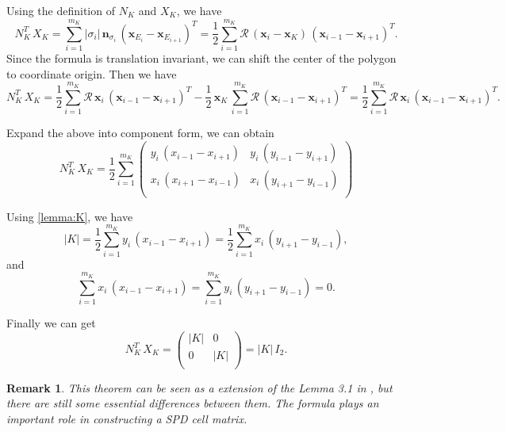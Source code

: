 \documentclass[times,review,preprint]{elsarticle}
\newtheorem{remark}{Remark}
\newcommand{\bx}{\bm{x}}
\newcommand{\bn}{\bm{n}}
\begin{document}
Using the definition of $N_K$ and $X_K$, we have
\begin{equation*}
N_K^T \, X_K = \sum_{i=1}^{m_K} |\sigma_{i}| \, \bn_{\sigma_{i}} \, (\bx_{E_{i}} - \bx_{E_{i+1}})^T = \frac12 \sum_{i=1}^{m_K} \mathcal{R} \, (\bx_{i} - \bx_K) \, (\bx_{i-1} - \bx_{i+1})^T.
\end{equation*}
Since the formula is translation invariant, we can shift the center of the polygon to coordinate origin. Then we have
\begin{equation*}
N_K^T \, X_K = \frac12 \sum_{i=1}^{m_K} \mathcal{R} \, \bx_{i} \, (\bx_{i-1} - \bx_{i+1})^T - \frac12 \, \bx_K \, \sum_{i=1}^{m_K} \mathcal{R} \, (\bx_{i-1} - \bx_{i+1})^T = \frac12 \sum_{i=1}^{m_K} \mathcal{R} \, \bx_{i} \, (\bx_{i-1} - \bx_{i+1})^T.
\end{equation*}

Expand the above into component form, we can obtain
\begin{equation*}
N_K^T \, X_K = \frac12 \sum_{i=1}^{m_K} \left(\begin{matrix}
y_{i} \, (x_{i-1} - x_{i+1}) & y_{i} \, (y_{i-1} - y_{i+1}) \\
x_{i} \, (x_{i+1} - x_{i-1}) & x_{i} \, (y_{i+1} - y_{i-1}) \\
\end{matrix}\right)
\end{equation*}

Using \cref{lemma:K}, we have
\begin{equation*}
|K| = \frac12 \sum_{i=1}^{m_K} y_{i} \, (x_{i-1} - x_{i+1}) = \frac12 \sum_{i=1}^{m_K} x_{i} \, (y_{i+1} - y_{i-1}),
\end{equation*}
and
\begin{equation*}
\sum_{i=1}^{m_K} x_{i} \, (x_{i-1} - x_{i+1}) = \sum_{i=1}^{m_K} y_{i} \, (y_{i+1} - y_{i-1}) = 0.
\end{equation*}

Finally we can get
\begin{equation*}
N_K^T \, X_K = \left(\begin{matrix}
|K| & 0 \\
0 & |K| \\
\end{matrix}\right)
= |K| \, I_2.
\end{equation*}

\begin{remark}
This theorem can be seen as a extension of the Lemma 3.1 in \cite{Wu-Gao-Dai}, but there are still some essential differences between them. The formula plays an important role in constructing a SPD cell matrix.
\end{remark}
\end{document}
